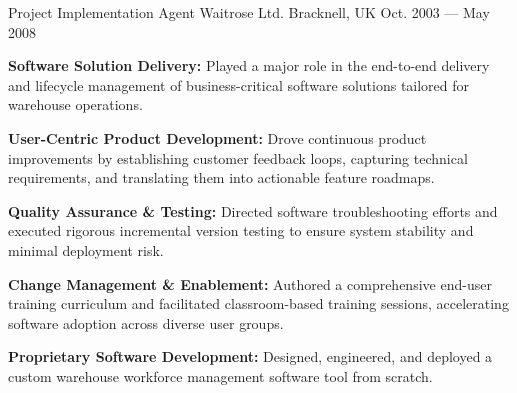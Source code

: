 \begin{cventries}
  \cventry
  {Project Implementation Agent} %
  {Waitrose Ltd. } %
  {Bracknell, UK} %
  {Oct. 2003 --- May 2008} %
  {
    \begin{cvitems} %
      \item {\textbf{Software Solution Delivery:} Played a major role in the end-to-end delivery and lifecycle management of business-critical software solutions tailored for warehouse operations.}
      \item {\textbf{User-Centric Product Development:} Drove continuous product improvements by establishing customer feedback loops, capturing technical requirements, and translating them into actionable feature roadmaps.}
      \item {\textbf{Quality Assurance \& Testing:} Directed software troubleshooting efforts and executed rigorous incremental version testing to ensure system stability and minimal deployment risk.}
      \item {\textbf{Change Management \& Enablement:} Authored a comprehensive end-user training curriculum and facilitated classroom-based training sessions, accelerating software adoption across diverse user groups.}
      \item {\textbf{Proprietary Software Development:} Designed, engineered, and deployed a custom warehouse workforce management software tool from scratch.}
    \end{cvitems}
  }

\end{cventries}
